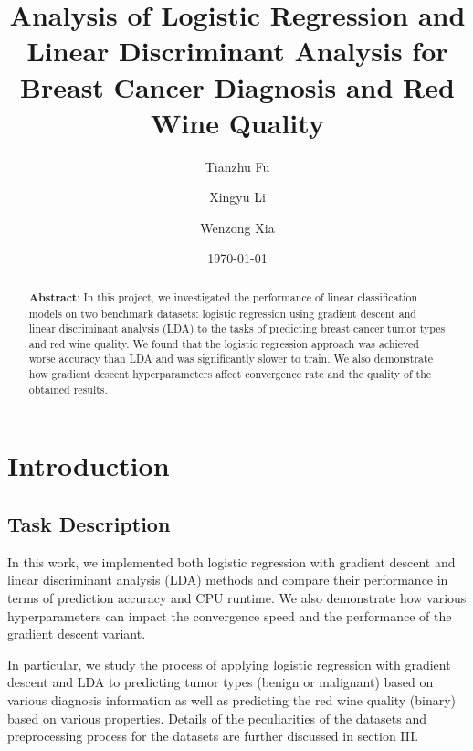 \documentclass[%
 aip,
 jmp,%
 amsmath,amssymb,
 reprint,%
]{revtex4-1}
\begin{document}

\title[]{Analysis of Logistic Regression and Linear Discriminant Analysis for Breast Cancer Diagnosis and Red Wine Quality}%

\author{Tianzhu Fu}
\author{Xingyu Li}%
\author{Wenzong Xia}

\date{\today}%

\begin{abstract}
\textbf{Abstract}: In this project, we investigated the performance of linear classification models on two benchmark datasets: logistic regression using gradient descent and linear discriminant analysis (LDA) to the tasks of predicting breast cancer tumor types and red wine quality. We found that the logistic regression approach was achieved worse accuracy than LDA and was significantly slower to train. We also demonstrate how gradient descent hyperparameters affect convergence rate and the quality of the obtained results. 
\end{abstract}

\maketitle


\section{\label{sec:level1}Introduction}
\subsection*{\label{sec:level2}Task Description}
In this work, we implemented both logistic regression with gradient descent and linear discriminant analysis (LDA) methods and compare their performance in terms of prediction accuracy and CPU runtime. We also demonstrate how various hyperparameters can impact the convergence speed and the performance of the gradient descent variant. \par

In particular, we study the process of applying logistic regression with gradient descent and LDA to predicting tumor types (benign or malignant) based on various diagnosis information as well as predicting the red wine quality (binary) based on various properties. Details of the peculiarities of the datasets and preprocessing process for the datasets are further discussed in section III.
\end{document}

